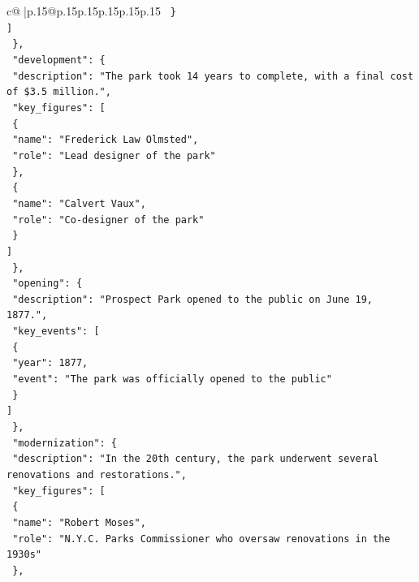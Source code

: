 \documentclass{article}
\begin{document}
{\begin{supertabular}{c@{$\;$}|p{.15\linewidth}@{}p{.15\linewidth}p{.15\linewidth}p{.15\linewidth}p{.15\linewidth}p{.15\linewidth}}
{{{\texttt{        \}} \\
\texttt{      {]}} \\
\texttt{    \},} \\
\texttt{    "development": \{} \\
\texttt{      "description": "The park took 14 years to complete, with a final cost of \$3.5 million.",} \\
\texttt{      "key\_figures": {[}} \\
\texttt{        \{} \\
\texttt{          "name": "Frederick Law Olmsted",} \\
\texttt{          "role": "Lead designer of the park"} \\
\texttt{        \},} \\
\texttt{        \{} \\
\texttt{          "name": "Calvert Vaux",} \\
\texttt{          "role": "Co{-}designer of the park"} \\
\texttt{        \}} \\
\texttt{      {]}} \\
\texttt{    \},} \\
\texttt{    "opening": \{} \\
\texttt{      "description": "Prospect Park opened to the public on June 19, 1877.",} \\
\texttt{      "key\_events": {[}} \\
\texttt{        \{} \\
\texttt{          "year": 1877,} \\
\texttt{          "event": "The park was officially opened to the public"} \\
\texttt{        \}} \\
\texttt{      {]}} \\
\texttt{    \},} \\
\texttt{    "modernization": \{} \\
\texttt{      "description": "In the 20th century, the park underwent several renovations and restorations.",} \\
\texttt{      "key\_figures": {[}} \\
\texttt{        \{} \\
\texttt{          "name": "Robert Moses",} \\
\texttt{          "role": "N.Y.C. Parks Commissioner who oversaw renovations in the 1930s"} \\
\texttt{        \},} \\
}}}
\end{supertabular}}
\end{document}
